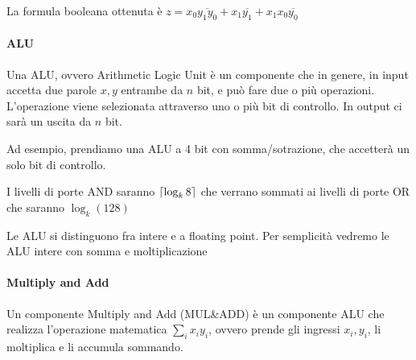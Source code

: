 
La formula booleana ottenuta è $ z = x_0\overbar{y_1y_0} + x_1\overbar{y_1} + x_1x_0\overbar{y_0} $

\paragraph{ALU}
Una ALU, ovvero Arithmetic Logic Unit è un componente che in genere, in input accetta due parole $ x,y $ entrambe da $ n $ bit, e può fare due o più operazioni. L'operazione viene selezionata attraverso uno o più bit di controllo. In output ci sarà un uscita da $ n $ bit.

Ad esempio, prendiamo una ALU a 4 bit con somma/sotrazione, che accetterà un solo bit di controllo.


I livelli di porte AND saranno $ \lceil\log_k8\rceil $ che verrano sommati ai livelli di porte OR che saranno $ \log_k(128) $

Le ALU si distinguono fra intere e a floating point. Per semplicità vedremo le ALU intere con somma e moltiplicazione

\paragraph{Multiply and Add}
Un componente Multiply and Add (MUL\&ADD) è un componente ALU che realizza l'operazione matematica $ \sum_{i}x_iy_i $, ovvero prende gli ingressi $ x_i,y_i $, li moltiplica e li accumula sommando.

